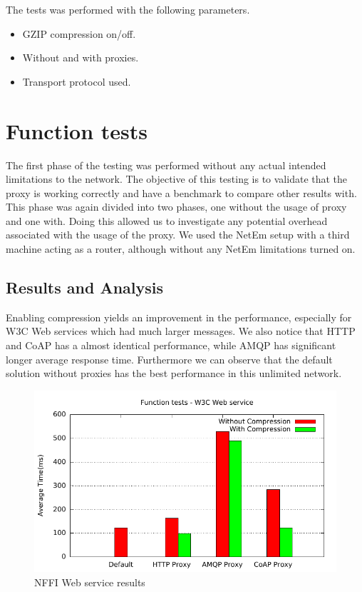 The tests was performed with the following parameters.

\begin{itemize}
	\item GZIP compression on/off.
	\item Without and with proxies.
    \item Transport protocol used.
\end{itemize}


\section{Function tests}

The first phase of the testing was performed without any actual intended
limitations to the network. The objective of this testing is to validate that
the proxy is working correctly and have a benchmark to compare other results
with. This phase was again divided into two phases, one without the usage of
proxy and one with. Doing this allowed us to investigate any potential
overhead associated with the usage of the proxy. We used the NetEm setup with
a third machine acting as a router, although without any NetEm limitations
turned on.


\subsection{Results and Analysis}

Enabling compression yields an improvement in the performance, especially for
W3C Web services which had much larger messages. We also notice that HTTP and
CoAP has a almost identical performance, while AMQP has significant longer
average response time. Furthermore we can observe that the default solution
without proxies has the best performance in this unlimited network.

\begin{figure}[H]
\center
\includegraphics[scale=0.75]{../results/function_tests/nffi/out.pdf}
\caption{NFFI Web service results}
\end{figure}

